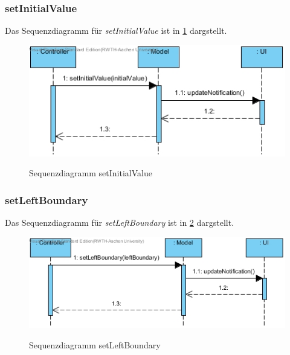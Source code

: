 \subsubsection*{setInitialValue}

Das Sequenzdiagramm für \emph{setInitialValue} ist in \ref{Sequenzdiagramm setInitialValue} dargstellt.

\begin{figure}[H]
	\centering
	\includegraphics[scale=.6]{Bilder/Model__setInitialValue().jpg}\\
	\caption{Sequenzdiagramm setInitialValue}
	\label{Sequenzdiagramm setInitialValue}
\end{figure}

\subsubsection*{setLeftBoundary}

Das Sequenzdiagramm für \emph{setLeftBoundary} ist in \ref{Sequenzdiagramm setLeftBoundary} dargstellt.

\begin{figure}[H]
	\centering
	\includegraphics[scale=.6]{Bilder/Model__setLeftBoundary().jpg}\\
	\caption{Sequenzdiagramm setLeftBoundary}
	\label{Sequenzdiagramm setLeftBoundary}
\end{figure}


